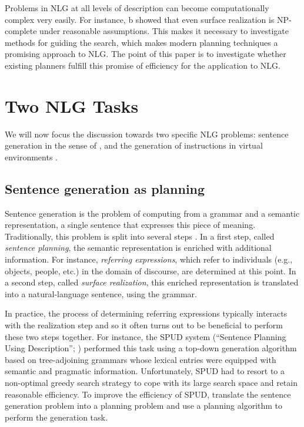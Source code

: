 \documentclass[letterpaper]{article}
\begin{document}
Problems in NLG at all levels of description can become
computationally complex very easily. For instance, \citet{KolStr02}b
showed that even surface realization is NP-complete under reasonable
assumptions. This makes it necessary to investigate methods for
guiding the search, which makes modern planning techniques a promising
approach to NLG. The point of this paper is to investigate whether
existing planners fulfill this promise of efficiency for the
application to NLG.




\section{Two NLG Tasks}
\label{sec:domains}

We will now focus the discussion towards two specific NLG problems:
sentence generation in the sense of \cite{KolSto07}, and the
generation of instructions in virtual environments
\cite{ByrKolStrCasDalMooObe09}. 


\subsection{Sentence generation as planning}

Sentence generation is the problem of computing from a grammar and a
semantic representation, a single sentence that expresses this piece of
meaning. Traditionally, this problem is split into several steps
\citep{reiter00building}. In a first step, called \emph{sentence planning},
the semantic representation is enriched with additional information. For
instance, \emph{referring expressions}, which refer to individuals (e.g.,
objects, people, etc.) in the domain of discourse, are determined at this
point. In a second step, called \emph{surface realization}, this enriched
representation is translated into a natural-language sentence, using the
grammar.

In practice, the process of determining referring expressions typically
interacts with the realization step and so it often turns out to be
beneficial to perform these two steps together. For instance, the SPUD
system (``Sentence Planning Using Description''; \citealt{Stone2003a})
performed this task using a top-down generation algorithm based on
tree-adjoining grammars \citep{joshi;etal1997} whose lexical entries were
equipped with semantic and pragmatic information. Unfortunately, SPUD had
to resort to a non-optimal greedy search strategy to cope with its large
search space and retain reasonable efficiency. To improve the efficiency
of SPUD, \citet{KolSto07} translate the sentence generation problem into a
planning problem and use a planning algorithm to perform the generation
task.
\end{document}
